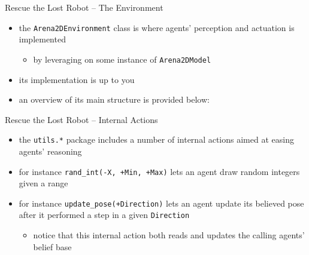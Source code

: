 \documentclass[presentation]{beamer}\mode<presentation>{\usetheme{AMSBolognaFC}}
\begin{document}
\begin{frame}[c, allowframebreaks]{Rescue the Lost Robot -- The Environment}
    \begin{itemize}
        \item the \texttt{\alert{Arena2DEnvironment}} class is where agents' perception and actuation is implemented
        \begin{itemize}
            \item by leveraging on some instance of \texttt{Arena2DModel}
        \end{itemize}
        
        \vspace{.3cm}
        
        \item its implementation is up to you
        
        \vspace{.3cm}
        
        \item an overview of its main structure is provided below:
        
        
    \end{itemize}
    
\end{frame} 

\begin{frame}[c]{Rescue the Lost Robot -- Internal Actions}
    \begin{itemize}
        \item the \texttt{\alert{utils}.*} package includes a number of internal actions aimed at easing agents' reasoning
        
        \vspace{.3cm}
        
        \item for instance \texttt{rand\_int(-X, +Min, +Max)} lets an agent draw random integers given a range
        
        \vspace{.3cm}
        
        \item for instance \texttt{update\_pose(+Direction)} lets an agent update its believed pose after it performed a step in a given \texttt{Direction}
        \begin{itemize}
            \item notice that this internal action both reads and updates the calling agents' belief base
        \end{itemize}
        
    \end{itemize}
    
\end{frame} 
\end{document}
